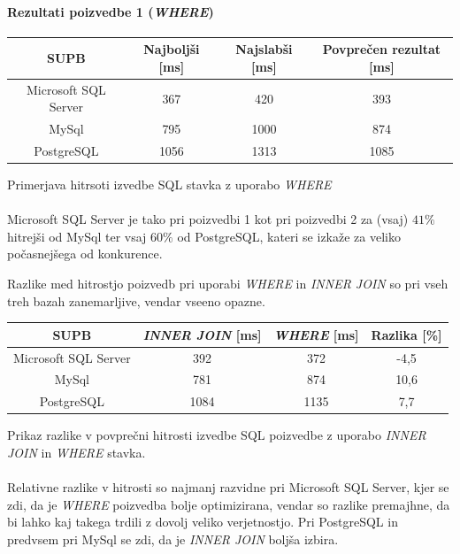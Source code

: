 \documentclass[a4paper,11pt]{report}
\begin{document}
\paragraph{Rezultati poizvedbe 1 (\textit{WHERE})}
\begin{center}
   \begin{tabular}{||c|c|c|c||}
      \hline
      \textbf{SUPB} & \textbf{Najboljši [ms]} & \textbf{Najslabši [ms]} & \textbf{Povprečen rezultat [ms]}\\
      \hline
      \hline
      Microsoft SQL Server & 367 & 420 & 393 \\
      MySql & 795 & 1000 & 874 \\
      PostgreSQL & 1056 & 1313 & 1085\\
      \hline
   \end{tabular}
\end{center}
Primerjava hitrsoti izvedbe SQL stavka z uporabo \textit{WHERE}
\\\\
Microsoft SQL Server je tako pri poizvedbi 1 kot pri poizvedbi 2 za (vsaj) \(41\%\) hitrejši od MySql ter vsaj \(60\%\) od PostgreSQL, 
kateri se izkaže za veliko počasnejšega od konkurence.

Razlike med hitrostjo poizvedb pri uporabi \textit{WHERE} in \textit{INNER JOIN} so pri vseh treh bazah zanemarljive, vendar vseeno opazne.

\begin{center}
   \begin{tabular}{||c|c|c|c||}
      \hline
      \textbf{SUPB} & \textbf{\textit{INNER JOIN} [ms]} & \textbf{\textit{WHERE} [ms]} & \textbf{Razlika [\%]}\\
      \hline
      \hline
      Microsoft SQL Server & 392 & 372 & -4,5 \\
      MySql & 781 & 874 & 10,6 \\
      PostgreSQL & 1084 & 1135 & 7,7\\
      \hline
   \end{tabular}
\end{center}
Prikaz razlike v povprečni hitrosti izvedbe SQL poizvedbe z uporabo \textit{INNER JOIN} in \textit{WHERE} stavka.
\\\\
Relativne razlike v hitrosti so najmanj razvidne pri Microsoft SQL Server, kjer se zdi, da je \textit{WHERE} poizvedba bolje optimizirana, vendar so razlike premajhne, da bi lahko kaj takega trdili z dovolj veliko verjetnostjo.
Pri PostgreSQL in predvsem pri MySql se zdi, da je \textit{INNER JOIN} boljša izbira.
\end{document}
